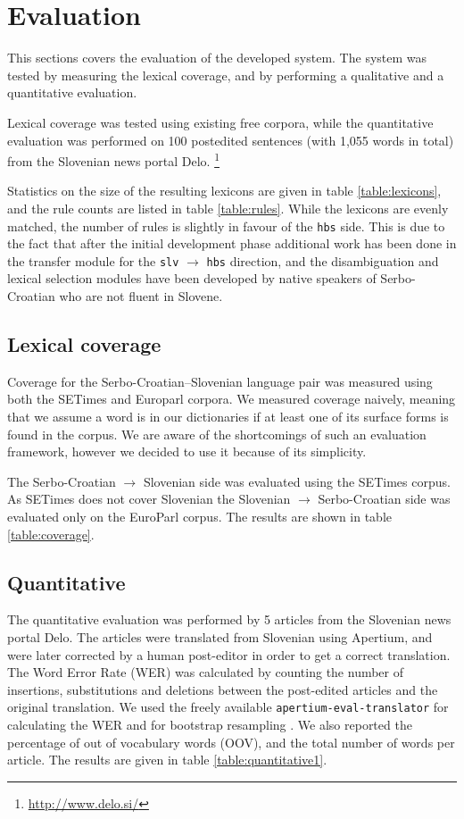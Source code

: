 \section{Evaluation}

This sections covers the evaluation of the developed system. 
The system was tested by measuring the lexical coverage, and by performing
a qualitative and a quantitative evaluation. 

Lexical coverage was tested using existing free corpora, 
while the quantitative evaluation was performed on 100 postedited sentences (with 1,055 words in
total) from the Slovenian news portal 
Delo. \footnote{\url{http://www.delo.si/}}

Statistics on the size of the resulting lexicons are given in table
\ref{table:lexicons}, and the rule counts are listed in table
\ref{table:rules}. While the lexicons are evenly matched, the number
of rules is slightly in favour of the \texttt{hbs} side. This is due
to the fact that after the initial development phase additional work
has been done in the transfer module for the \texttt{slv}
$\rightarrow$ \texttt{hbs} direction, and the disambiguation and
lexical selection modules have been developed by native speakers of
Serbo-Croatian who are not fluent in Slovene.

\subsection{Lexical coverage}

Coverage for the Serbo-Croatian--Slovenian language pair was measured using both the SETimes \cite{tyers2010south} and Europarl \cite{koehn05a} corpora. 
We measured coverage naively, meaning that we assume a word is in our 
dictionaries if at least one of its surface forms is found in the corpus. 
We are aware of the shortcomings of such an evaluation framework, 
however we decided to use it because of its simplicity.

The Serbo-Croatian $\rightarrow$ Slovenian side was evaluated using the SETimes corpus.
As SETimes does not cover Slovenian
the Slovenian $\rightarrow$ Serbo-Croatian side was evaluated only on the EuroParl corpus. The results are shown in table \ref{table:coverage}.

\subsection{Quantitative}

The quantitative evaluation was performed by 5 articles
from the Slovenian news portal Delo.
The articles were translated from Slovenian using Apertium, and were later corrected by a human post-editor in order to get a correct translation.
The Word Error Rate (WER) was calculated
by counting the number of insertions, substitutions and deletions between the post-edited articles
and the original translation. We used the freely available \texttt{apertium-eval-translator} for calculating the WER 
and for bootstrap resampling \cite{koehn04}.
We also reported the percentage of out of vocabulary words (OOV), and the total number of words per article.
The results are given in table \ref{table:quantitative1}.

